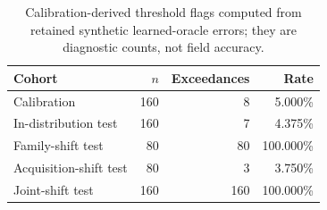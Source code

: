 \begin{table}[htbp]
\centering
\caption{Calibration-derived threshold flags computed from retained synthetic learned-oracle errors; they are diagnostic counts, not field accuracy.}
\label{tab:threshold-reconciliation}
\begin{tabular}{lrrr}
\toprule
Cohort & $n$ & Exceedances & Rate \\
\midrule
Calibration & 160 & 8 & 5.000\% \\
In-distribution test & 160 & 7 & 4.375\% \\
Family-shift test & 80 & 80 & 100.000\% \\
Acquisition-shift test & 80 & 3 & 3.750\% \\
Joint-shift test & 160 & 160 & 100.000\% \\
\bottomrule
\end{tabular}
\end{table}
